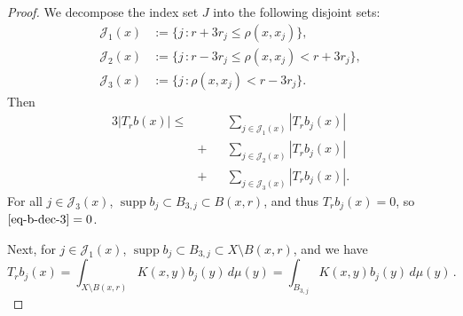 \documentclass[10pt,a4paper]{article}
\theoremstyle{plain}
\theoremstyle{definition}
\numberwithin{equation}{subsection}
\DeclareMathOperator{\supp}{\operatorname{supp}}
\newcommand{\leanok}{}
\begin{document}
\begin{proof}
\leanok
We decompose the index set $J$ into the following disjoint sets:
\begin{align*}
    \mathcal{J}_1(x)&:=\{j\,: r+3r_j \le \rho(x,x_j) \},\\
    \mathcal{J}_2(x)&:=\{j\,: r-3r_j \le \rho(x,x_j) < r+3r_j\},\\
    \mathcal{J}_3(x)&:=\{j\,: \rho(x,x_j) < r-3r_j\}.
\end{align*}
Then
\begin{alignat}{3}
    \label{eq-b-dec-1}
    |T_r b(x)|\le&&&\sum_{j\in \mathcal{J}_1(x)} |T_rb_j(x)| \\
    \label{eq-b-dec-2}
                &+&&\sum_{j\in \mathcal{J}_2(x)} |T_rb_j(x)| \\
    \label{eq-b-dec-3}
                &+&&\sum_{j\in \mathcal{J}_3(x)} |T_rb_j(x)|.
\end{alignat}
For all $j\in \mathcal{J}_3(x)$, $\supp b_j\subset B_{3,j}\subset B(x,r)$, and thus $T_rb_j(x)=0$, so $\eqref{eq-b-dec-3} = 0$.

Next, for $j\in \mathcal{J}_1(x)$, $\supp b_j\subset B_{3,j}\subset X \setminus B(x,r)$, and we have
\begin{equation*}
    T_rb_j(x)=\int_{X\setminus B(x,r)} K(x,y) b_j(y)\,d\mu(y)=\int_{B_{3,j}} K(x,y) b_j(y)\,d\mu(y)\,.
\end{equation*}


\end{proof}
\end{document}
